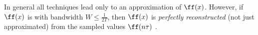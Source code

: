 In general all techniques lead only to an approximation of $\ff(x)$.
However, if $\ff(x)$ is  with bandwidth 
$W\le\frac{1}{2T}$,
then $\ff(x)$ is {\em perfectly reconstructed} (not just approximated)
from the sampled values $\ff(n\tau)$ .









